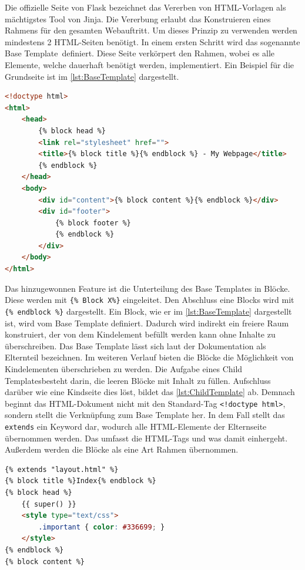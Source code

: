 \documentclass[a4paper,titlepage,halfparskip,12pt]{scrreprt}
\begin{document}
\begin{onehalfspacing}
Die offizielle Seite von Flask bezeichnet das Vererben von HTML-Vorlagen als mächtigstes Tool von Jinja. Die Vererbung erlaubt das Konstruieren eines Rahmens für den gesamten Webauftritt. Um dieses Prinzip zu verwenden werden mindestens 2 HTML-Seiten benötigt. In einem ersten Schritt wird das sogenannte \glqq Base Template\grqq\ definiert. Diese Seite verkörpert den Rahmen, wobei es alle Elemente, welche dauerhaft benötigt werden, implementiert. Ein Beispiel für die Grundseite ist im \autoref{lst:BaseTemplate} dargestellt.
\begin{lstlisting}[language=HTML,caption=Beispiel einer Grundseite für das Vererbungsprinzip,label={lst:BaseTemplate}]
<!doctype html>
<html>
	<head>
		{% block head %}
		<link rel="stylesheet" href="">
		<title>{% block title %}{% endblock %} - My Webpage</title>
		{% endblock %}
	</head>
	<body>
		<div id="content">{% block content %}{% endblock %}</div>
		<div id="footer">
			{% block footer %}
			{% endblock %}
		</div>
	</body>
</html>
\end{lstlisting}
Das hinzugewonnen Feature ist die Unterteilung des Base Templates in Blöcke. Diese werden mit \texttt{\{\% Block X\%\}} eingeleitet. Den Abschluss eine Blocks wird mit \texttt{\{\% endblock \%\}} dargestellt. Ein Block, wie er im \autoref{lst:BaseTemplate} dargestellt ist, wird vom Base Template definiert. Dadurch wird indirekt ein freiere Raum konstruiert, der von dem Kindelement befüllt werden kann ohne Inhalte zu überschreiben. Das Base Template lässt sich laut der Dokumentation als Elternteil bezeichnen. Im weiteren Verlauf bieten die Blöcke die Möglichkeit von Kindelementen überschrieben zu werden. Die Aufgabe eines \glqq Child Templates\grqq besteht darin, die leeren Blöcke mit Inhalt zu füllen. Aufschluss darüber wie eine Kindseite dies löst, bildet das \autoref{lst:ChildTemplate} ab. Demnach beginnt das HTML-Dokument nicht mit den Standard-Tag \texttt{<!doctype html>}, sondern stellt die Verknüpfung zum Base Template her. In dem Fall stellt das \texttt{extends} ein Keyword dar, wodurch alle HTML-Elemente der Elternseite übernommen werden. Das umfasst die HTML-Tags und was damit einhergeht. Außerdem werden die Blöcke als eine Art Rahmen übernommen.
\begin{lstlisting}[language=HTML,caption=Beispiel einer Grundseite für das Vererbungsprinzip,label={lst:ChildTemplate}]
{% extends "layout.html" %}
{% block title %}Index{% endblock %}
{% block head %}
	{{ super() }}
	<style type="text/css">
		.important { color: #336699; }
	</style>
{% endblock %}
{% block content %}

\end{lstlisting}
\end{onehalfspacing}
\end{document}
